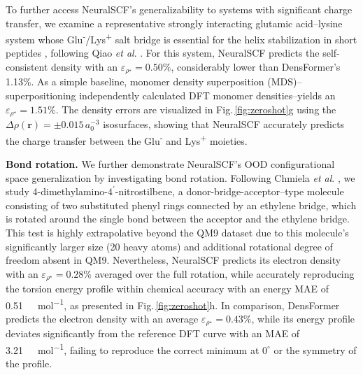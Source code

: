 \documentclass[%
reprint,
superscriptaddress,
bibnotes,
amsmath,amssymb,
aps,
floatfix, %
]{revtex4-2}
\begin{document}
To further access NeuralSCF's generalizability to systems with significant charge transfer, we examine a representative strongly interacting glutamic acid–lysine system whose Glu\textsuperscript{-}/Lys\textsuperscript{+} salt bridge is essential for the helix stabilization in short peptides \cite{marqusee1987helix}, following Qiao \textit{et al}. \cite{qiao2022}. For this system, NeuralSCF predicts the self-consistent density with an $\varepsilon_{\rho^\star} = 0.50\%$, considerably lower than DensFormer's 1.13\%. As a simple baseline, monomer density superposition (MDS)--superpositioning independently calculated DFT monomer densities--yields an $\varepsilon_{\rho^\star} = 1.51\%$. The density errors are visualized in Fig.\,\ref{fig:zeroshot}g using the $\Delta \rho(\bm{r}) = \pm 0.015 \, a_0^{-3}$ isosurfaces, showing that NeuralSCF accurately predicts the charge transfer between the Glu\textsuperscript{-} and Lys\textsuperscript{+} moieties.

\vspace{\baselineskip}

\noindent\textbf{Bond rotation.} We further demonstrate NeuralSCF's OOD configurational space generalization by investigating bond rotation. Following Chmiela \textit{et al}. \cite{chmiela2023md22}, we study 4-dimethylamino-$4^\prime$-nitrostilbene, a donor-bridge-acceptor–type molecule consisting of two substituted phenyl rings connected by an ethylene bridge, which is rotated around the single bond between the acceptor and the ethylene bridge. This test is highly extrapolative beyond the QM9 dataset due to this molecule's significantly larger size (20 heavy atoms) and additional rotational degree of freedom absent in QM9. Nevertheless, NeuralSCF predicts its electron density with an $\varepsilon_{\rho^\star} = 0.28\%$ averaged over the full rotation, while accurately reproducing the torsion energy profile within chemical accuracy with an energy MAE of \SI{0.51}{\kilo\cal\per\mol}, as presented in Fig.\,\ref{fig:zeroshot}h. In comparison, DensFormer predicts the electron density with an average $\varepsilon_{\rho^\star} = 0.43\%$, while its energy profile deviates significantly from the reference DFT curve with an MAE of \SI{3.21}{\kilo\cal\per\mol}, failing to reproduce the correct minimum at $0^\circ$ or the symmetry of the profile.

\end{document}
